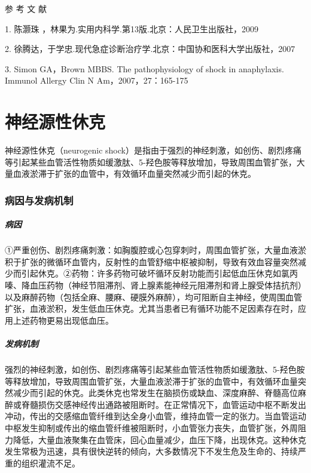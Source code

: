 \protect\hypertarget{text00064.html}{}{}

\hypertarget{text00064.htmlux5cux23CHP2-5-4}{}
参 考 文 献

1. 陈灏珠 ，林果为.实用内科学.第13版.北京：人民卫生出版社，2009

2. 徐腾达，于学忠.现代急症诊断治疗学.北京：中国协和医科大学出版社，2007

3. Simon GA，Brown MBBS. The pathophysiology of shock in anaphylaxis.
Immunol Allergy Clin N Am，2007，27：165-175

\protect\hypertarget{text00065.html}{}{}

\chapter{神经源性休克}

神经源性休克（neurogenic
shock）是指由于强烈的神经刺激，如创伤、剧烈疼痛等引起某些血管活性物质如缓激肽、5-羟色胺等释放增加，导致周围血管扩张，大量血液淤滞于扩张的血管中，有效循环血量突然减少而引起的休克。

\subsection{病因与发病机制}

\paragraph{病因}

①严重创伤、剧烈疼痛刺激：如胸腹腔或心包穿刺时，周围血管扩张，大量血液淤积于扩张的微循环血管内，反射性的血管舒缩中枢被抑制，导致有效血容量突然减少而引起休克。②药物：许多药物可破坏循环反射功能而引起低血压休克如氯丙嗪、降血压药物（神经节阻滞剂、肾上腺素能神经元阻滞剂和肾上腺受体拮抗剂）以及麻醉药物（包括全麻、腰麻、硬膜外麻醉），均可阻断自主神经，使周围血管扩张，血液淤积，发生低血压休克。尤其当患者已有循环功能不足因素存在时，应用上述药物更易出现低血压。

\paragraph{发病机制}

强烈的神经刺激，如创伤、剧烈疼痛等引起某些血管活性物质如缓激肽、5-羟色胺等释放增加，导致周围血管扩张，大量血液淤滞于扩张的血管中，有效循环血量突然减少而引起的休克。此类休克也常发生在脑损伤或缺血、深度麻醉、脊髓高位麻醉或脊髓损伤交感神经传出通路被阻断时。在正常情况下，血管运动中枢不断发出冲动，传出的交感缩血管纤维到达全身小血管，维持血管一定的张力。当血管运动中枢发生抑制或传出的缩血管纤维被阻断时，小血管张力丧失，血管扩张，外周阻力降低，大量血液聚集在血管床，回心血量减少，血压下降，出现休克。这种休克发生常极为迅速，具有很快逆转的倾向，大多数情况下不发生危及生命的、持续严重的组织灌流不足。

